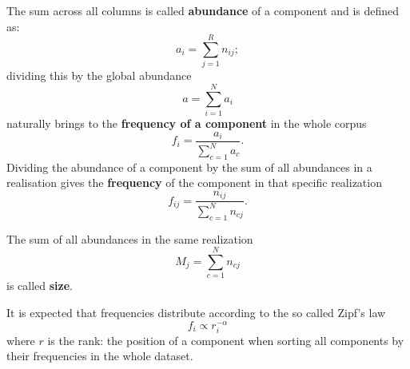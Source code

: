 The sum across all columns is called \textbf{abundance} of a component and is defined as:
\begin{equation}\label{eq:abundance}
a_i=\sum_{j=1}^{R}n_{ij};
\end{equation}
dividing this by the global abundance 
\begin{equation}
  a=\sum_{i=1}^{N}a_i
\end{equation}
naturally brings to the \textbf{frequency of a component} in the whole corpus
\begin{equation}\label{eq:fi}
f_i=\frac{a_i}{\sum_{c=1}^{N}a_{c}}.
\end{equation}
Dividing the abundance of a component by the sum of all abundances in a realisation gives the \textbf{frequency} of the component in that specific realization
\begin{equation}
f_{ij}=\frac{n_{ij}}{\sum_{c=1}^{N}n_{cj}}.
\end{equation}

The sum of all abundances in the same realization
\begin{equation}\label{eq:size}
M_j=\sum_{c=1}^{N}n_{cj}
\end{equation}
is called \textbf{size}.

It is expected that frequencies distribute according to the so called Zipf's law
\begin{equation}\label{eq:zipf}
f_i\propto r_i^{-\alpha}
\end{equation}
where $r$ is the rank: the position of a component when sorting all components by their frequencies in the whole dataset.